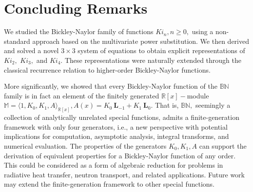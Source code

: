 \documentclass[pdflatex,sn-mathphys-num]{sn-jnl}%
\theoremstyle{thmstyleone}%
\theoremstyle{thmstyletwo}%
\theoremstyle{thmstylethree}%
\begin{document}
\section{Concluding Remarks}
We studied the Bickley-Naylor family of functions $Ki_n,n\ge 0,$ using a non-standard approach based on the multivariate power substitution. We then derived and solved a novel $3\times 3$ system of equations to obtain explicit representations of $Ki_2,$ $Ki_3,$ and $Ki_4.$ These representations were naturally extended through the classical recurrence relation to higher-order Bickley-Naylor functions.

More significantly, we showed that every Bickley-Naylor function of the $\mathbb{BN}$ family is in fact an element of the finitely generated $\mathbb{R}[x]-$module $\mathbb{M}=\langle 1, K_0,K_1,A\rangle_{\mathbb{R}[x]}, A(x)=K_0 \:\pmb{L}_{-1} + K_1 \:\pmb{L}_0.$ That is, $\mathbb{BN},$ seemingly a collection of analytically unrelated special functions, admits a finite-generation framework with only four generators, i.e., a new perspective with potential implications for computation, asymptotic analysis, integral transforms, and numerical evaluation. The properties of the generators $K_0,K_1,A$ can support the derivation of equivalent properties for a Bickley-Naylor function of any order. This could be considered as a form of algebraic reduction for problems in radiative heat transfer, neutron transport, and related applications. Future work may extend the finite-generation framework to other special functions.
\end{document}
